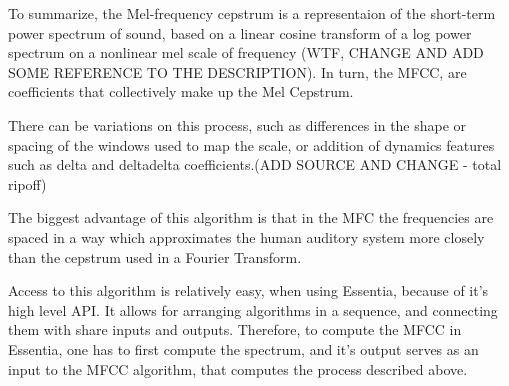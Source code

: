 To summarize, the Mel-frequency cepstrum is a representaion of the
short-term power spectrum of sound, based on a linear cosine transform
of a log power spectrum on a nonlinear mel scale of frequency (WTF,
CHANGE AND ADD SOME REFERENCE TO THE DESCRIPTION). In turn, the MFCC,
are coefficients that collectively make up the Mel Cepstrum.

%

There can be variations on this process, such as differences in the
shape or spacing of the windows used to map the scale, or addition of
dynamics features such as delta and deltadelta coefficients.(ADD
SOURCE AND CHANGE - total ripoff)

The biggest advantage of this algorithm is that in the MFC the
frequencies are spaced in a way which approximates the human auditory
system more closely than the cepstrum used in a Fourier Transform.


Access to this algorithm is relatively easy, when using Essentia,
because of it's high level API. It allows for arranging algorithms in
a sequence, and connecting them with share inputs and
outputs. Therefore, to compute the MFCC in Essentia, one has to first
compute the spectrum, and it's output serves as an input to the MFCC
algorithm, that computes the process described above.


